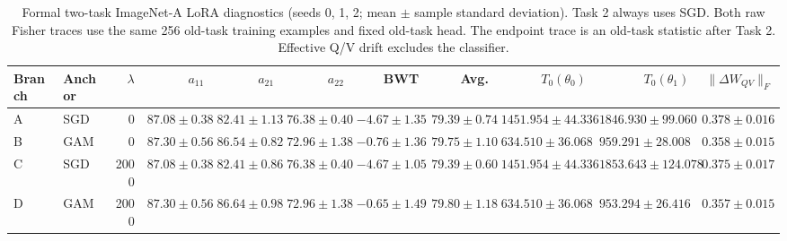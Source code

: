 \begin{table}[t]
\centering
\scriptsize
\caption{Formal two-task ImageNet-A LoRA diagnostics (seeds 0, 1, 2; mean $\pm$ sample standard deviation). Task 2 always uses SGD. Both raw Fisher traces use the same 256 old-task training examples and fixed old-task head. The endpoint trace is an old-task statistic after Task 2. Effective Q/V drift excludes the classifier.}
\label{tab:formal_rq2_b3}
\setlength{\tabcolsep}{3pt}
\begin{tabular}{llrrrrrrrrr}
\toprule
Branch & Anchor & $\lambda$ & $a_{11}$ & $a_{21}$ & $a_{22}$ & BWT & Avg. & $T_0(\theta_0)$ & $T_0(\theta_1)$ & $\|\Delta W_{QV}\|_F$ \\
\midrule
A & SGD & 0 & $87.08 \pm 0.38$ & $82.41 \pm 1.13$ & $76.38 \pm 0.40$ & $-4.67 \pm 1.35$ & $79.39 \pm 0.74$ & $1451.954 \pm 44.336$ & $1846.930 \pm 99.060$ & $0.378 \pm 0.016$ \\
B & GAM & 0 & $87.30 \pm 0.56$ & $86.54 \pm 0.82$ & $72.96 \pm 1.38$ & $-0.76 \pm 1.36$ & $79.75 \pm 1.10$ & $634.510 \pm 36.068$ & $959.291 \pm 28.008$ & $0.358 \pm 0.015$ \\
C & SGD & 2000 & $87.08 \pm 0.38$ & $82.41 \pm 0.86$ & $76.38 \pm 0.40$ & $-4.67 \pm 1.05$ & $79.39 \pm 0.60$ & $1451.954 \pm 44.336$ & $1853.643 \pm 124.078$ & $0.375 \pm 0.017$ \\
D & GAM & 2000 & $87.30 \pm 0.56$ & $86.64 \pm 0.98$ & $72.96 \pm 1.38$ & $-0.65 \pm 1.49$ & $79.80 \pm 1.18$ & $634.510 \pm 36.068$ & $953.294 \pm 26.416$ & $0.357 \pm 0.015$ \\
\bottomrule
\end{tabular}
\end{table}
